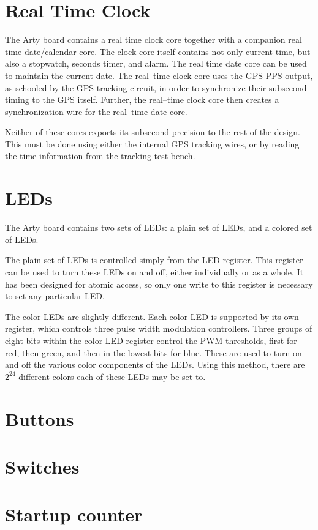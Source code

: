 \documentclass{gqtekspec}
\begin{document}
\section{Real Time Clock}

The Arty board contains a real time clock core together with a companion
real time date/calendar core.  The clock core itself contains not only current
time, but also a stopwatch, seconds timer, and alarm.  The real time date core
can be used to maintain the current date.  The real--time clock core uses the
GPS PPS output, as schooled by the GPS tracking circuit, in order to synchronize
their subsecond timing to the GPS itself.  Further, the real--time clock core
then creates a synchronization wire for the real--time date core.

Neither of these cores exports its subsecond precision to the rest of the
design.  This must be done using either the internal GPS tracking wires, or
by reading the time information from the tracking test bench.

\section{LEDs}

The Arty board contains two sets of LEDs: a plain set of LEDs, and a colored
set of LEDs.

The plain set of LEDs is controlled simply from the LED register.  This register
can be used to turn these LEDs on and off, either individually or as a whole.
It has been designed for atomic access, so only one write to this register
is necessary to set any particular LED.

The color LEDs are slightly different.  Each color LED is supported by its
own register, which controls three pulse width modulation controllers.  Three
groups of eight bits within the color LED register control the PWM thresholds,
first for red, then green, and then in the lowest bits for blue.  These are
used to turn on and off the various color components of the LEDs.  Using this
method, there are $2^{24}$ different colors each of these LEDs may be set
to.  

\section{Buttons}
\section{Switches}
\section{Startup counter}
\end{document}
